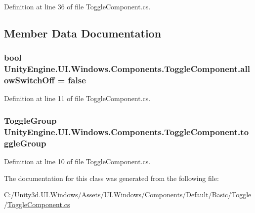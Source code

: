 Definition at line 36 of file Toggle\+Component.\+cs.



\subsection{Member Data Documentation}
\hypertarget{class_unity_engine_1_1_u_i_1_1_windows_1_1_components_1_1_toggle_component_a3d4e429fc3094276f22b4bba6e703663}{}
\subsubsection[{allow\+Switch\+Off}]{\setlength{\rightskip}{0pt plus 5cm}bool Unity\+Engine.\+U\+I.\+Windows.\+Components.\+Toggle\+Component.\+allow\+Switch\+Off = false}\label{class_unity_engine_1_1_u_i_1_1_windows_1_1_components_1_1_toggle_component_a3d4e429fc3094276f22b4bba6e703663}


Definition at line 11 of file Toggle\+Component.\+cs.

\hypertarget{class_unity_engine_1_1_u_i_1_1_windows_1_1_components_1_1_toggle_component_a9b82de53773623bfd74b7598255a8c1c}{}
\subsubsection[{toggle\+Group}]{\setlength{\rightskip}{0pt plus 5cm}Toggle\+Group Unity\+Engine.\+U\+I.\+Windows.\+Components.\+Toggle\+Component.\+toggle\+Group}\label{class_unity_engine_1_1_u_i_1_1_windows_1_1_components_1_1_toggle_component_a9b82de53773623bfd74b7598255a8c1c}


Definition at line 10 of file Toggle\+Component.\+cs.



The documentation for this class was generated from the following file\+:\begin{DoxyCompactItemize}
\item 
C\+:/\+Unity3d.\+U\+I.\+Windows/\+Assets/\+U\+I.\+Windows/\+Components/\+Default/\+Basic/\+Toggle/\hyperlink{_toggle_component_8cs}{Toggle\+Component.\+cs}\end{DoxyCompactItemize}
